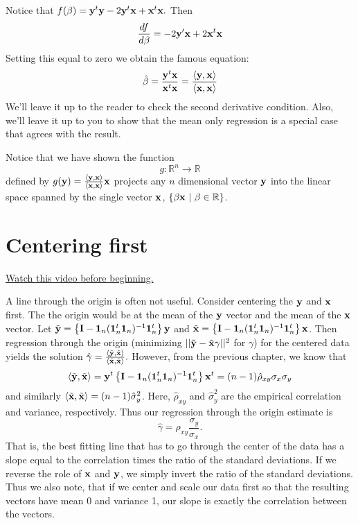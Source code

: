 Notice that
$
f(\beta) = \mathbf{y}^t \mathbf{y} - 2 \mathbf{y}^t \mathbf{x} + \mathbf{x}^t \mathbf{x}.
$
Then 
$$
\frac{df}{d\beta} = -2\mathbf{y}'\mathbf{x}  + 2 \mathbf{x}^t \mathbf{x} 
$$
Setting this equal to zero we obtain the famous equation:
$$
\hat \beta = \frac{\mathbf{y}^t \mathbf{x}}{\mathbf{x}^t \mathbf{x}}
=\frac{\langle \mathbf{y}, \mathbf{x} \rangle}{\langle \mathbf{x}, \mathbf{x} \rangle}
$$
We'll leave it up to the reader to check the second derivative 
condition. Also, we'll leave it up to you to show that the mean 
only regression is a  special case that agrees with the result.

Notice that we have shown the function
$$
g : \mathbb{R}^n \rightarrow \mathbb{R}
$$
defined by $g(\mathbf{y}) = \frac{\langle \mathbf{y}, \mathbf{x} \rangle}{\langle \mathbf{x}, \mathbf{x} \rangle}\mathbf{x}$ projects
any $n$ dimensional vector $\mathbf{y}$ into the linear space spanned
by the single vector $\mathbf{x}$, $\{\beta \mathbf{x} ~|~ \beta \in \mathbb{R}\}$.

\section{Centering first}

\href{https://www.youtube.com/watch?v=1ss_FYtiSHo&list=PLpl-gQkQivXhdgUCdaUQcdb31CRe8Mm2y&index=8}{Watch this video before beginning.}

A line through the origin is often not useful. Consider centering the
$\mathbf{y}$ and $\mathbf{x}$ first. The the origin would be at the mean of the
$\mathbf{y}$ vector and the mean of the $\mathbf{x}$ vector. Let
$\tilde {\mathbf{y}} = \left\{ \mathbf{I} - \mathbf{1}_n (\mathbf{1}_n^t \mathbf{1}_n)^{-1} \mathbf{1}_n^t \right\} \mathbf{y}$ and $\tilde {\mathbf{x}} = \left\{ \mathbf{I} - \mathbf{1}_n (\mathbf{1}_n^t \mathbf{1}_n)^{-1} \mathbf{1}_n^t \right\} \mathbf{x}$. Then regression through the origin (minimizing
$||\tilde {\mathbf{y}} - \tilde {\mathbf{x}} \gamma ||^2$ for $\gamma$)
for the centered data yields
the solution 
$
\hat \gamma = \frac{\langle \tilde {\mathbf{y}}, \tilde {\mathbf{x}} \rangle}{\langle \tilde {\mathbf{x}}, \tilde {\mathbf{x}} \rangle}.
$
However, from the previous chapter, we know that
$$
\langle \tilde {\mathbf{y}}, \tilde {\mathbf{x}} \rangle = \mathbf{y}^t \left\{ \mathbf{I} - \mathbf{1}_n (\mathbf{1}_n^t \mathbf{1}_n)^{-1} \mathbf{1}_n^t \right\} \mathbf{x}^t
= (n-1)\hat{\rho}_{xy} \sigma_x \sigma_y
$$
and similarly $\langle \tilde {\mathbf{x}}, \tilde {\mathbf{x}} \rangle = (n-1)\hat{\sigma}_y^2$.
Here, $\hat \rho_{xy}$ and $\hat{\sigma}_y^2$ are the empirical correlation and
variance, respectively. Thus our regression through the origin estimate is
$$
\hat \gamma = \rho_{xy} \frac{\sigma_y}{\sigma_x}.
$$
That is, the best fitting line that has to go through the center of the data
has a slope equal to the correlation times the ratio of the standard deviations.
If we reverse the role of $\mathbf{x}$ and $\mathbf{y}$, we simply invert the ratio of the
standard deviations. Thus we also note, that if we center and scale our
data first so that the resulting vectors have mean 0 and variance 1, our
slope is exactly the correlation between the vectors.

